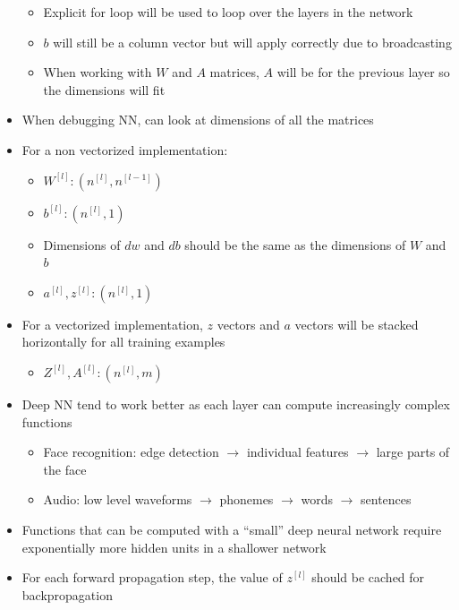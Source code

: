 \documentclass[12pt, letterpaper]{article}
\begin{document}
\begin{itemize}
        \begin{itemize}
            \item Explicit for loop will be used to loop over the layers in the network
            \item $b$ will still be a column vector but will apply correctly due to broadcasting
            \item When working with $W$ and $A$ matrices, $A$ will be for the previous layer so the dimensions will fit
        \end{itemize}
        \item When debugging NN, can look at dimensions of all the matrices
        \item For a non vectorized implementation:
        \begin{itemize}
            \item $W^{[l]}:(n^{[l]},n^{[l-1]})$
            \item $b^{[l]}:(n^{[l]},1)$
            \item Dimensions of $dw$ and $db$ should be the same as the dimensions of $W$ and $b$
            \item $a^{[l]}, z^{[l]}:(n^{[l]},1)$ 
        \end{itemize}
        \item For a vectorized implementation, $z$ vectors and $a$ vectors will be stacked horizontally for all training examples
        \begin{itemize}
            \item $Z^{[l]},A^{[l]}:(n^{[l]},m)$
        \end{itemize}
        \item Deep NN tend to work better as each layer can compute increasingly complex functions
        \begin{itemize}
            \item Face recognition: edge detection $\rightarrow$ individual features $\rightarrow$ large parts of the face
            \item Audio: low level waveforms $\rightarrow$ phonemes $\rightarrow$ words $\rightarrow$ sentences
        \end{itemize}
        \item Functions that can be computed with a ``small'' deep neural network require exponentially more hidden units in a shallower network
        \item For each forward propagation step, the value of $z^{[l]}$ should be cached for backpropagation
        \begin{itemize}

\end{itemize}
\end{itemize}
\end{document}

